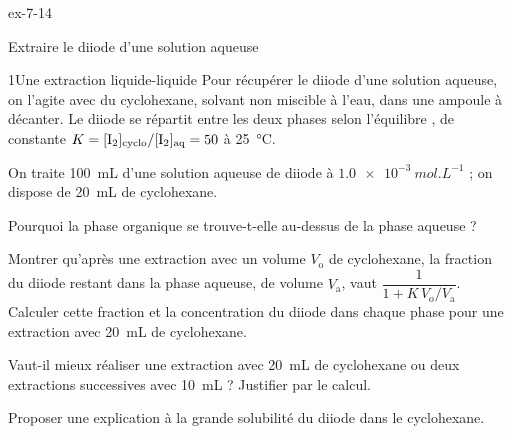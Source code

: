 \begin{blocLivre}{ex-7-14}
\begin{exercice}[3]{Extraire le diiode d'une solution aqueuse}
\begin{docu}{1}{Une extraction liquide-liquide}
Pour récupérer le diiode d'une solution aqueuse, on l'agite avec du cyclohexane, solvant non miscible à l'eau, dans
une ampoule à décanter. Le diiode se répartit entre les deux phases selon l'équilibre
, de constante \mbox{$K=[\ce{I2}]_\text{cyclo}/[\ce{I2}]_\text{aq}=50$} à 25~°C.
\end{docu}
\begin{donnees}
On traite 100~mL d'une solution aqueuse de diiode à $\qty{1,0e-3}{mol.L^{-1}}$ ; on dispose de 20~mL de cyclohexane.
\end{donnees}
\begin{questions}
\item Pourquoi la phase organique se trouve-t-elle au-dessus de la phase aqueuse ?
\item Montrer qu'après une extraction avec un volume $V_\mathrm{o}$ de cyclohexane, la fraction du diiode restant dans
la phase aqueuse, de volume $V_\mathrm{a}$, vaut $\dfrac{1}{1+K\,V_\mathrm{o}/V_\mathrm{a}}$. Calculer cette fraction et la
concentration du diiode dans chaque phase pour une extraction avec 20~mL de cyclohexane.
\item \initiative Vaut-il mieux réaliser une extraction avec 20~mL de cyclohexane ou deux extractions successives avec
10~mL ? Justifier par le calcul.
\item Proposer une explication à la grande solubilité du diiode dans le cyclohexane.
\end{questions}
\end{exercice}
\end{blocLivre}
